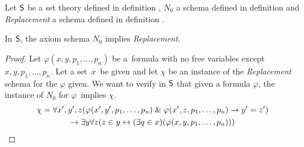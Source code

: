 Let $\sf{S}$ be a set theory defined in definition , $N_0$ a schema defined in definition  and \emph{Replacement} a schema defined in definition .
\begin{theorem} 
In $\sf{S}$, the axiom schema $N_0$ implies \emph{Replacement}.
\end{theorem}
\begin{proof}
Let $\varphi(x, y, p_1, \ldots, p_n)$ be a~formula with no free variables except $x, y, p_1, \ldots, p_n$.
Let a set~$x$~be given and let $\chi$ be an instance of the \emph{Replacement} schema for the $\varphi$ given.
We want to verify in $\sf{S}$ that given a formula $\varphi$, the instance of $N_0$ for $\varphi$ implies $\chi$.
\begin{equation}
\begin{gathered}
\chi = \forall x', y', z(\varphi(x', y', p_1, \ldots, p_n) \mathrel{\&} \varphi(x', z, p_1, \ldots, p_n) \rightarrow y' = z') \\
\rightarrow \exists y \forall z (z \in y \leftrightarrow (\exists q \in x)(\varphi(x, y, p_1, \ldots, p_n)))
\end{gathered}
\end{equation}


\end{proof}
